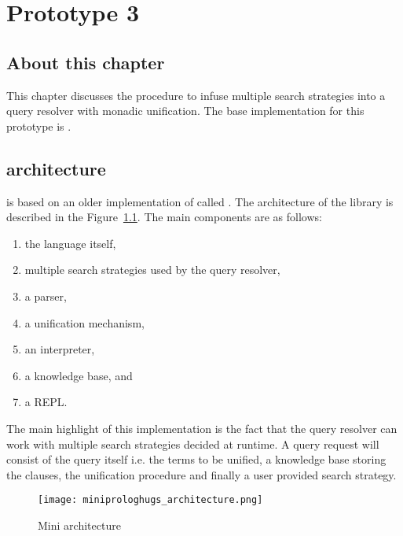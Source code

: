 \documentclass[thesis-solanki.tex]{files}
\begin{document}
\chapter{Prototype 3}{\label{proto3}}


\section{About this chapter}
This chapter discusses the procedure to infuse multiple search strategies into a  query resolver with monadic unification. 
The base implementation for this prototype is  \cite{website:mini-prolog-hugs98}.


\section{ \cite{website:mini-prolog-hugs98} architecture}
 is based on an older implementation of  called . The architecture of
the library is described in the Figure~\ref{fig:miniprlgarchitecture}. The main components are as follows:

\begin{enumerate}
\item the language itself,

\item multiple search strategies used by the query resolver,

\item a parser,

\item a unification mechanism,

\item an interpreter,

\item a knowledge base, and

\item a REPL.  
\end{enumerate}

The main highlight of this implementation is the fact that the query resolver can work with multiple search strategies decided at runtime. A query request 
will consist of the query itself i.e. the terms to be unified, a knowledge base storing the clauses, the unification procedure and finally a user provided 
search strategy. 


\begin{figure}[H]
  \centering
  \texttt{[image: miniprologhugs\_architecture.png]}
  \caption{Mini  architecture}
  \label{fig:miniprlgarchitecture}
\end{figure}
\end{document}
